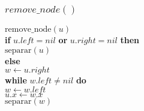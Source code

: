 \documentclass{beamer}
\begin{document}
\begin{frame}
\frametitle{$remove\_node()$}
\begin{oframed}
\begin{flushleft}
\hspace*{1em} \ensuremath{\mathrm{remove\_node}(\ensuremath{\mathit{u}})}\\
\hspace*{1em} \hspace*{1em} {\color{black} \textbf{if}} \ensuremath{\ensuremath{\mathit{u}}.\ensuremath{\mathit{left}} = nil} {\color{black} \textbf{or}} \ensuremath{\ensuremath{\mathit{u}}.\ensuremath{\mathit{right}} = nil} {\color{black} \textbf{then}} \\
\hspace*{1em} \hspace*{1em} \hspace*{1em} \ensuremath{\mathrm{separar}(\ensuremath{\mathit{u}})}\\
\hspace*{1em} \hspace*{1em} {\color{black} \textbf{else}}  \\
\hspace*{1em} \hspace*{1em} \hspace*{1em} \ensuremath{\ensuremath{\mathit{w}} \gets  \ensuremath{\ensuremath{\mathit{u}}.right}}\\
\hspace*{1em} \hspace*{1em} \hspace*{1em} {\color{black} \textbf{while}} \ensuremath{\ensuremath{\mathit{w}}.\ensuremath{\mathit{left}} \ne nil} {\color{black} \textbf{do}}  \\
\hspace*{1em} \hspace*{1em} \hspace*{1em} \hspace*{1em} \hspace*{1em} \ensuremath{\ensuremath{\mathit{w}} \gets  \ensuremath{\ensuremath{\mathit{w}}.left}}\\
\hspace*{1em} \hspace*{1em} \hspace*{1em} \ensuremath{\ensuremath{\mathit{u}}.\ensuremath{x} \gets  \ensuremath{\ensuremath{\mathit{w}}.x}}\\
\hspace*{1em} \hspace*{1em} \hspace*{1em} \ensuremath{\mathrm{separar}(\ensuremath{\mathit{w}})}\\
\end{flushleft}
\end{oframed}
\end{frame}
\end{document}

